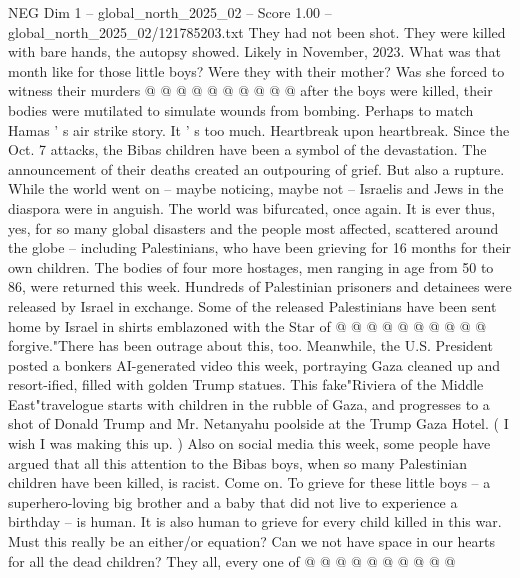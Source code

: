 \begin{textsample}{NEG Dim 1 – global\_north\_2025\_02 – Score 1.00 – global\_north\_2025\_02/121785203.txt}
They had not been shot.
They were killed with bare hands, the autopsy showed.
Likely in November, 2023.
What was that month like for those little boys?
Were they with their mother?
Was she forced to witness their murders @ @ @ @ @ @ @ @ @ @ after the boys were killed, their bodies were mutilated to simulate wounds from bombing.
Perhaps to match Hamas ' s air strike story.
It ' s too much.
Heartbreak upon heartbreak.
Since the Oct. 7 attacks, the Bibas children have been a symbol of the devastation.
The announcement of their deaths created an outpouring of grief.
But also a rupture.
While the world went on -- maybe noticing, maybe not -- Israelis and Jews in the diaspora were in anguish.
The world was bifurcated, once again.
It is ever thus, yes, for so many global disasters and the people most affected, scattered around the globe -- including Palestinians, who have been grieving for 16 months for their own children.
The bodies of four more hostages, men ranging in age from 50 to 86, were returned this week.
Hundreds of Palestinian prisoners and detainees were released by Israel in exchange.
Some of the released Palestinians have been sent home by Israel in shirts emblazoned with the Star of @ @ @ @ @ @ @ @ @ @ forgive."There has been outrage about this, too.
Meanwhile, the U.S.
President posted a bonkers AI-generated video this week, portraying Gaza cleaned up and resort-ified, filled with golden Trump statues.
This fake"Riviera of the Middle East"travelogue starts with children in the rubble of Gaza, and progresses to a shot of Donald Trump and Mr.
Netanyahu poolside at the Trump Gaza Hotel. ( I wish I was making this up. ) Also on social media this week, some people have argued that all this attention to the Bibas boys, when so many Palestinian children have been killed, is racist.
Come on.
To grieve for these little boys -- a superhero-loving big brother and a baby that did not live to experience a birthday -- is human.
It is also human to grieve for every child killed in this war.
Must this really be an either/or equation?
Can we not have space in our hearts for all the dead children?
They all, every one of @ @ @ @ @ @ @ @ @ @

\end{textsample}
